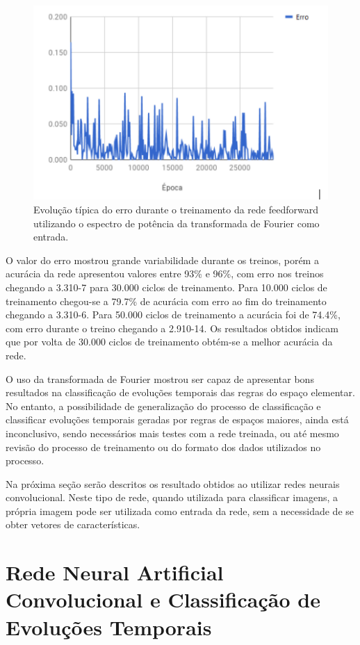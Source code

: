 \documentclass[12pt,a4paper]{report}
\begin{document}
	\begin{figure}[H]
		\centering
		\includegraphics[scale=1.0]{./img/evolucao_erro_feedforward.png}
		\caption{Evolução típica do erro durante o treinamento da rede feedforward utilizando o espectro de potência da transformada de Fourier como entrada.}
		\label{fig:EvolucaoErroFeedforward}
	\end{figure}
	
	O valor do erro mostrou grande variabilidade durante os treinos, porém a acurácia da rede apresentou valores entre 93\% e 96\%, com erro nos treinos chegando a 3.310-7 para 30.000 ciclos de treinamento. Para 10.000 ciclos de treinamento chegou-se a 79.7\% de acurácia com erro ao fim do treinamento chegando a 3.310-6. Para 50.000 ciclos de treinamento a acurácia foi de 74.4\%, com erro durante o treino chegando a 2.910-14. Os resultados obtidos indicam que por volta de 30.000 ciclos de treinamento obtém-se a melhor acurácia da rede.
	
	O uso da transformada de Fourier mostrou ser capaz de apresentar bons resultados na classificação de evoluções temporais das regras do espaço elementar. No entanto, a possibilidade de generalização do processo de classificação e classificar evoluções temporais geradas por regras de espaços maiores, ainda está inconclusivo, sendo necessários mais testes com a rede treinada, ou até mesmo revisão do processo de treinamento ou do formato dos dados utilizados no processo.
	
	Na próxima seção serão descritos os resultado obtidos ao utilizar redes neurais convolucional. Neste tipo de rede, quando utilizada para classificar imagens, a própria imagem pode ser utilizada como entrada da rede, sem a necessidade de se obter vetores de características.
	
	
	\section{Rede Neural Artificial Convolucional e Classificação de Evoluções Temporais}
	
\end{document}
